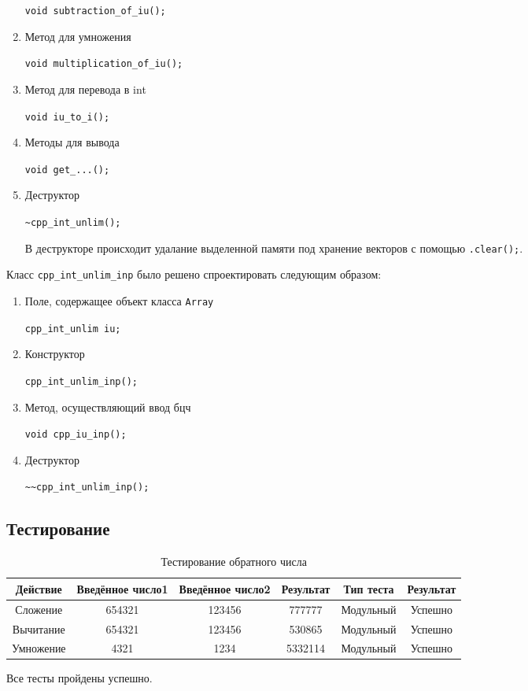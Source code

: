 \documentclass[12pt,a4paper]{report}
\begin{document}
\begin{enumerate}
	\verb+void subtraction_of_iu();+
	
	\item Метод для умножения
	
	\verb+void multiplication_of_iu();+
	
	\item Метод для перевода в int
	
	\verb+void iu_to_i();+
	
	\item Методы для вывода
	
	\verb+void get_...();+
	
	\item Деструктор	
	
	\verb+~cpp_int_unlim();+
	
	В деструкторе происходит удалание выделенной памяти под хранение векторов с помощью \verb+.clear();+.
	
\end{enumerate}

Класс \verb+cpp_int_unlim_inp+ было решено спроектировать следующим образом: 
\begin{enumerate}
 	\item Поле, содержащее объект класса \verb+Array+
 	
 	\verb+cpp_int_unlim iu;+
 	
	\item Конструктор
	
	\verb+cpp_int_unlim_inp();+

	\item Метод, осуществляющий ввод бцч
	
	\verb+void cpp_iu_inp();+
	
	\item Деструктор	
	
	\verb+~~cpp_int_unlim_inp();+
	
\end{enumerate}

\subsection{Тестирование}
\begin{table}[h]
\caption{Тестирование обратного числа}
\label{sum_of_digits_test}
\begin{tabular}{|c|c|c|c|c|c|}
\hline 
Действие & Введённое число1 & Введённое число2 & Результат & Тип теста & Результат \\ 
\hline 
Сложение & 654321 & 123456 & 777777 & Модульный & Успешно \\ 
\hline 
Вычитание & 654321 & 123456 & 530865 & Модульный & Успешно \\ 
\hline 
Умножение & 4321 & 1234 & 5332114 & Модульный & Успешно \\ 
\hline 
\end{tabular} 
\end{table}
Все тесты пройдены успешно.
\end{document}

